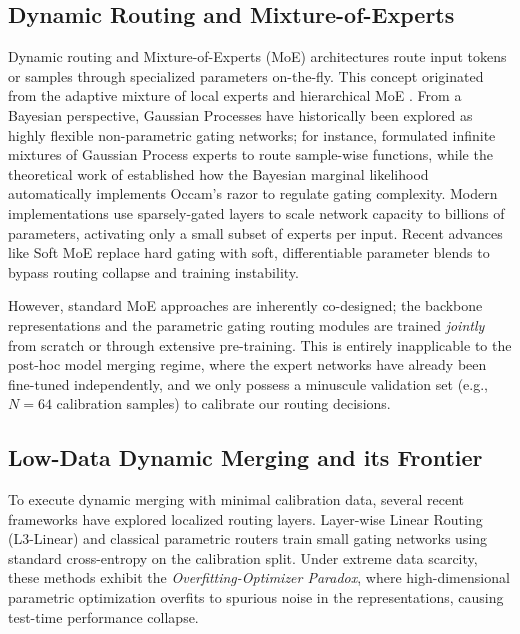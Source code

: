 \subsection{Dynamic Routing and Mixture-of-Experts}
Dynamic routing and Mixture-of-Experts (MoE) architectures route input tokens or samples through specialized parameters on-the-fly. This concept originated from the adaptive mixture of local experts \cite{jacobs1991adaptive} and hierarchical MoE \cite{jordan1994hierarchical}. From a Bayesian perspective, Gaussian Processes have historically been explored as highly flexible non-parametric gating networks; for instance, \cite{rasmussen2001infinite} formulated infinite mixtures of Gaussian Process experts to route sample-wise functions, while the theoretical work of \cite{rasmussen2001occam} established how the Bayesian marginal likelihood automatically implements Occam's razor to regulate gating complexity. Modern implementations use sparsely-gated layers \cite{shazeer2017outrageously, fedus2022switch} to scale network capacity to billions of parameters, activating only a small subset of experts per input. Recent advances like Soft MoE \cite{puigcerver2023sparse} replace hard gating with soft, differentiable parameter blends to bypass routing collapse and training instability.

However, standard MoE approaches are inherently co-designed; the backbone representations and the parametric gating routing modules are trained \emph{jointly} from scratch or through extensive pre-training. This is entirely inapplicable to the post-hoc model merging regime, where the expert networks have already been fine-tuned independently, and we only possess a minuscule validation set (e.g., $N=64$ calibration samples) to calibrate our routing decisions.

\subsection{Low-Data Dynamic Merging and its Frontier}
To execute dynamic merging with minimal calibration data, several recent frameworks have explored localized routing layers. Layer-wise Linear Routing (L3-Linear) and classical parametric routers train small gating networks using standard cross-entropy on the calibration split. Under extreme data scarcity, these methods exhibit the \emph{Overfitting-Optimizer Paradox}, where high-dimensional parametric optimization overfits to spurious noise in the representations, causing test-time performance collapse.

